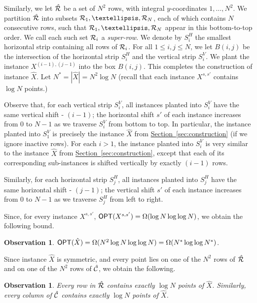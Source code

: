 \documentclass[11pt]{article}
\numberwithin{equation}{section}
\theoremstyle{definition}
\theoremstyle{plain}
\newcommand{\expref}[2]{\hyperref[#2]{#1~\ref{#2}}}
\newtheorem{myobs}[theorem]{Observation}
\begin{document}
Similarly, we let $\hat {{\mathcal R}}$ be a set of $N^2$ rows, with integral $y$-coordinates $1,\ldots,N^2$. We partition $\hat {{\mathcal R}}$ into subsets $\rset_1,\ldots,\rset_N$, each of which contains $N$ consecutive rows, such that $\rset_1,\ldots,\rset_N$ appear in this bottom-to-top order. We call each such set ${\mathcal R}_i$ a \emph{super-row}.  We denote by $S^H_i$ the smallest horizontal strip containing all rows of ${\mathcal R}_i$.
For all $1\leq i,j\leq N$, we let $B(i,j)$ be the intersection of the horizontal strip $S^H_i$ and the vertical strip $S^V_i$. We plant the instance $X^{(i-1),(j-1)}$ into the box $B(i,j)$. 
This completes the construction of instance $\hat{X}$. 
Let $N^* = |\hat{X}| = N^2 \log N$ (recall that  each instance $X^{s,s'}$ contains $\log N$ points.) 


Observe that, for each vertical strip $S^V_i$, all instances planted into $S^V_i$ have the same vertical shift - $(i-1)$; the horizontal shift $s'$ of each instance increases from $0$ to $N-1$ as we traverse $S^V_i$ from bottom to top. 
In particular, the instance planted into $S^V_1$ is precisely the instance $\hat X$ from \expref{Section}{sec:construction} (if we ignore inactive rows).  
For each $i>1$, the instance planted into $S^V_i$ is very similar to the instance  $\hat X$ from \expref{Section}{sec:construction}, except that each of its corresponding sub-instances is shifted vertically by exactly $(i-1)$ rows.

Similarly, for each horizontal strip  $S^H_j$, all instances planted into $S^H_j$ have the same horizontal shift - $(j-1)$; the vertical shift $s'$ of each instance increases from $0$ to $N-1$ as we traverse $S^H_j$ from left to right.


Since, for every  instance $X^{s,s'}$, $\mbox{\sf OPT}(X^{s,s'})=\Omega(\log N\log\log N)$, we obtain the following bound.
%
\begin{myobs} 
 $\mbox{\sf OPT}(\hat X)=\Omega(N^2\log N\log\log N)=\Omega(N^*\log\log N^*)$. 
\end{myobs} 

Since instance $\hat X$ is symmetric, and every point lies on one of the $N^2$ rows of $\hat{{\mathcal R}}$ and on one of the $N^2$ rows of $\hat{{\mathcal C}}$, we obtain the following.

\begin{myobs} 
Every row in $\hat{{\mathcal R}}$ contains exactly $\log N$ points of $\hat X$. Similarly, every column of $\hat{{\mathcal C}}$  contains exactly $\log N$ points of $\hat X$.
\end{myobs} 
\end{document}
